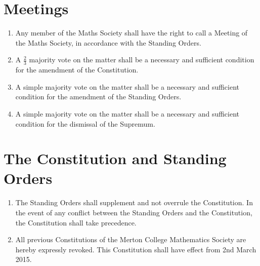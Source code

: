 \documentclass[pdftex,a4paper]{report}
\begin{document}
\section*{Meetings}

\begin{enumerate}[label=\Roman*)]
	\item Any member of the Maths Society shall have the right to call a Meeting of the Maths Society, in accordance with the Standing Orders.
	\item A $\frac{2}{3}$ majority vote on the matter shall be a necessary and sufficient condition for the amendment of the Constitution.
	\item A simple majority vote on the matter shall be a necessary and sufficient condition for the amendment of the Standing Orders.
	\item A simple majority vote on the matter shall be a necessary and sufficient condition for the dismissal of the Supremum.
\end{enumerate}


\section*{The Constitution and Standing Orders}

\begin{enumerate}[label=\Roman*)]
	\item The Standing Orders shall supplement and not overrule the Constitution. In the event of any conflict between the Standing Orders and the Constitution, the Constitution shall take precedence.
	\item All previous Constitutions of the Merton College Mathematics Society are hereby expressly revoked. This Constitution shall have effect from 2nd March 2015.
\end{enumerate}
\end{document}
